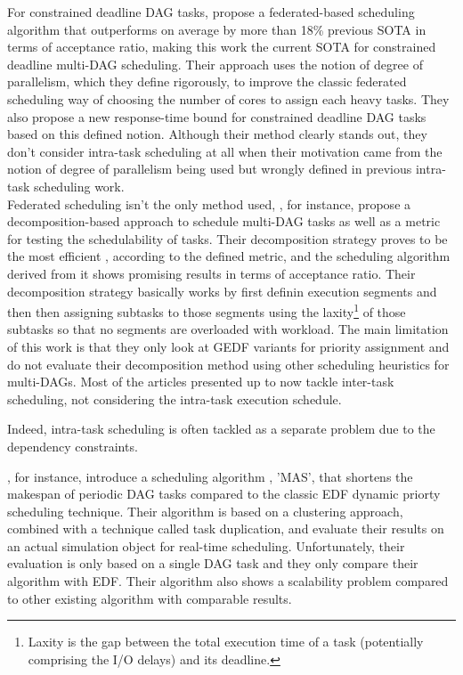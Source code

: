 For constrained deadline DAG tasks, 
\citet{He2023DegreeOfParallelism} propose a federated-based
scheduling algorithm that outperforms on average by more than 18\%
previous SOTA\cite{Jiang2023SchedVirtualProcs} in terms of acceptance
ratio, making this work the current SOTA for constrained deadline multi-DAG scheduling.
Their approach uses the notion of degree of parallelism, which they 
define rigorously, to improve the classic federated scheduling way of 
choosing the number of cores to assign each heavy tasks.
They also propose a new response-time bound for constrained deadline DAG tasks
based on this defined notion.
Although their method clearly stands out,
they don't consider intra-task scheduling at all 
when their motivation came from the notion 
of degree of parallelism being used
but wrongly defined in previous intra-task scheduling work\cite{Zhao2022DAGsched}\cite{zhao2020DAGsched}.\\

Federated scheduling isn't the only method used,
\citet{JiangDecompoSchedParallelTask},
for instance, propose a decomposition-based 
approach to schedule multi-DAG tasks as well as 
a metric for testing the schedulability of tasks.
Their decomposition strategy proves to be the most efficient 
, according to the defined metric, and the scheduling algorithm
derived from it shows promising results in terms of
acceptance ratio.
Their decomposition strategy basically works by first 
definin execution segments and then then assigning subtasks 
to those segments using the laxity\footnote{Laxity is the gap between the total execution time of a task (potentially comprising the I/O delays) and its deadline.} of those subtasks so that 
no segments are overloaded with workload.
The main limitation of this work is that 
they only look at GEDF variants for priority assignment 
and do not evaluate their decomposition method
using other scheduling heuristics for multi-DAGs.
Most of the articles presented up to now 
tackle inter-task scheduling, not considering
the intra-task execution schedule.

Indeed, intra-task scheduling\cite{He2019DagIntra}\cite{Xiao2019}
\cite{Shi2024DagExecGroups}\cite{Zhao2024GATDRLmodel}\cite{Lee2021GlobalDagSchedDRL}
\cite{GuanFRTDS2020RL} is often tackled as a separate
problem due to the dependency constraints.

\citet{Xiao2019}, for instance, introduce a scheduling algorithm 
, 'MAS', that shortens the makespan of periodic DAG tasks
compared to the classic EDF dynamic priorty scheduling technique.
Their algorithm is based on a clustering approach, combined with
a technique called task duplication, and evaluate their results
on an actual simulation object for real-time scheduling.
Unfortunately, their evaluation is only based on a single DAG task
and they only compare their algorithm with EDF.
Their algorithm also shows a scalability problem compared to 
other existing algorithm with comparable results.

